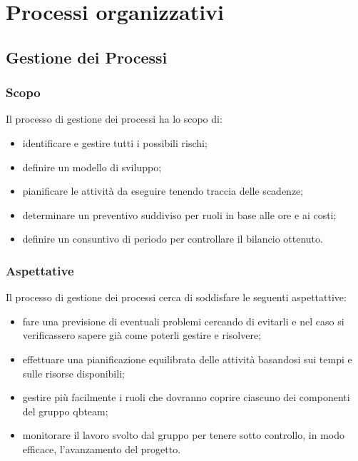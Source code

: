 \section{Processi organizzativi}
\subsection{Gestione dei Processi}
\subsubsection{Scopo}
Il processo di gestione dei processi ha lo scopo di:
\begin{itemize}
	\item identificare e gestire tutti i possibili rischi;
	\item definire un modello di sviluppo;
	\item pianificare le attività da eseguire tenendo traccia delle scadenze;
	\item determinare un preventivo suddiviso per ruoli in base alle ore e ai costi;
	\item definire un consuntivo di periodo per controllare il bilancio ottenuto.
\end{itemize}

\subsubsection{Aspettative}
Il processo di gestione dei processi cerca di soddisfare le seguenti aspettattive:
\begin{itemize}
	\item fare una previsione di eventuali problemi cercando di evitarli e nel caso si verificassero sapere già come poterli gestire e risolvere;
	\item effettuare una pianificazione equilibrata delle attività basandosi sui tempi e sulle risorse disponibili;
	\item gestire più facilmente i ruoli che dovranno coprire ciascuno dei componenti del gruppo qbteam;
	\item monitorare il lavoro svolto dal gruppo per tenere sotto controllo, in modo efficace, l'avanzamento del progetto.
\end{itemize}

